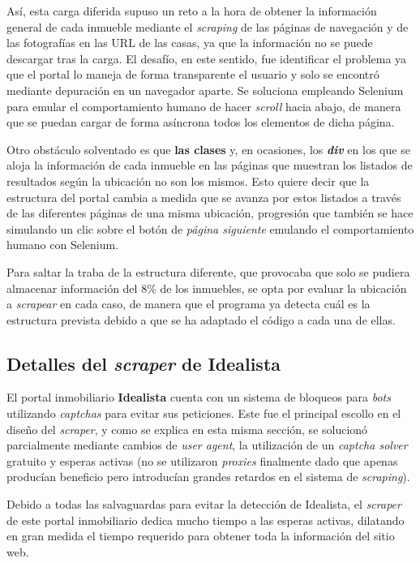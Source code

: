 \documentclass[12pt]{article}
\begin{document}
Así, esta carga diferida supuso un reto a la hora de obtener la información general de cada inmueble mediante el \textit{scraping} de las páginas de navegación y de las fotografías en las URL de las casas, ya que la información no se puede descargar tras la carga. El desafío, en este sentido, fue identificar el problema ya que el portal lo maneja de forma transparente el usuario y solo se encontró  mediante depuración en un navegador aparte. Se soluciona empleando Selenium para emular el comportamiento humano de hacer \textit{scroll} hacia abajo, de manera que se puedan cargar de forma asíncrona todos los elementos de dicha página.

Otro obstáculo solventado es que \textbf{las clases} y, en ocasiones, los \textbf{\textit{div}} en los que se aloja la información de cada inmueble en las páginas que muestran los listados de resultados según la ubicación no son los mismos. Esto quiere decir que la estructura del portal cambia a medida que se avanza por estos listados a través de las diferentes páginas de una misma ubicación, progresión que también se hace simulando un clic sobre el botón de \textit{página siguiente} emulando el comportamiento humano con Selenium. 

Para saltar la traba de la estructura diferente, que provocaba que solo se pudiera almacenar información del 8\% de los inmuebles, se opta por evaluar la ubicación a \textit{scrapear} en cada caso, de manera que el programa ya detecta cuál es la estructura prevista debido a que se ha adaptado el código a cada una de ellas.

\vspace{-1.5em}\subsection*{Detalles del \textit{scraper} de Idealista}\vspace{-1em}

El portal inmobiliario \textbf{Idealista} cuenta con un sistema de bloqueos para \textit{bots} utilizando \textit{captchas} para evitar sus peticiones. Este fue el principal escollo en el diseño del \textit{scraper}, y como se explica en esta misma sección, se solucionó parcialmente mediante cambios de \textit{user agent}, la utilización de un \textit{captcha solver} gratuito y esperas activas (no se utilizaron \textit{proxies} finalmente dado que apenas producían beneficio pero introducían grandes retardos en el sistema de \textit{scraping}).

Debido a todas las salvaguardas para evitar la detección de Idealista, el \textit{scraper} de este portal inmobiliario dedica mucho tiempo a las esperas activas, dilatando en gran medida el tiempo requerido para obtener toda la información del sitio web. 
\end{document}
